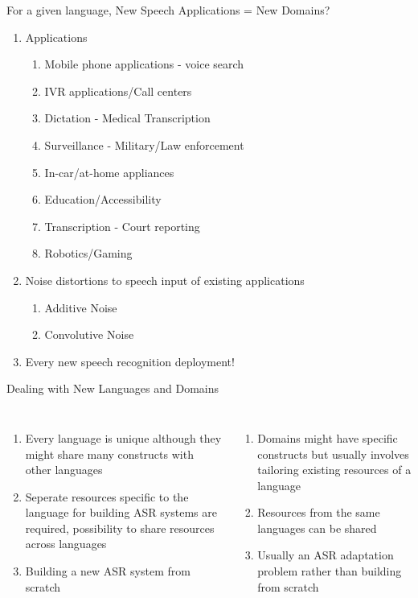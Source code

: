 \begin{frame}{For a given language, New Speech Applications = New Domains?}

\begin{enumerate}
\item \alert{Applications}
\begin{enumerate}
  \item Mobile phone applications - voice search
  \item IVR applications/Call centers
  \item Dictation - Medical Transcription
  \item Surveillance - Military/Law enforcement
  \item In-car/at-home appliances
  \item Education/Accessibility
  \item Transcription - Court reporting
  \item Robotics/Gaming
\end{enumerate}
\item \alert{Noise distortions} to speech input of existing applications
\begin{enumerate}
  \item Additive Noise
  \item Convolutive Noise
\end{enumerate}
\item Every \alert{new} speech recognition deployment!
\end{enumerate}
\end{frame}

\begin{frame}{Dealing with New Languages and Domains}
\begin{columns}[T]
\column{2in}
\centering
{\color{orange}{New Languages}}
\begin{enumerate}
\item Every language is \alert{unique} although they might share many constructs with other languages
\item \alert{Seperate resources} specific to the language for building ASR systems are required,
possibility to share resources across languages
\item \alert{Building a new ASR system from scratch}
\end{enumerate}
\column{2in}
\centering
{\color{ForestGreen}{New Domains}}
\begin{enumerate}
\item Domains might have specific constructs but usually involves \alert{tailoring existing resources} of a language
\item Resources from the same languages can be \alert{shared}
\item Usually \alert{an ASR adaptation problem} rather than building from scratch
\end{enumerate}
\end{columns}
\end{frame}

